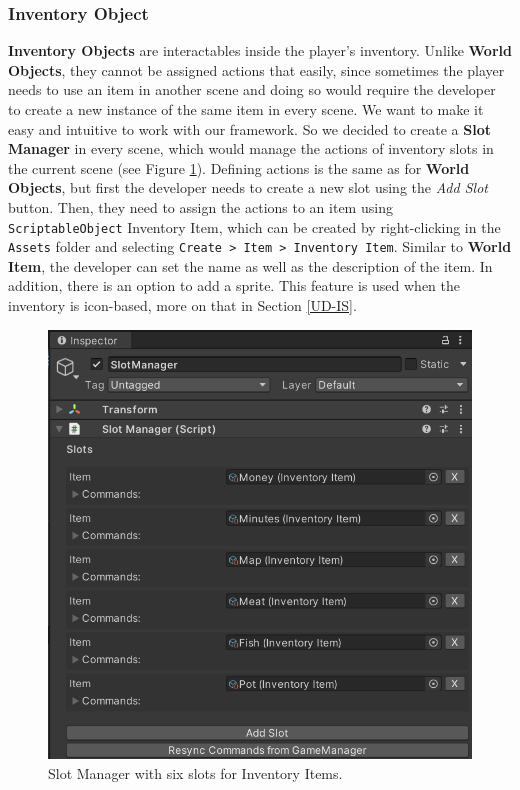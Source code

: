 \subsubsection{Inventory Object}
\label{Manual:IO}
\textbf{Inventory Objects} are interactables inside the player's inventory. Unlike \textbf{World Objects}, they cannot be assigned actions that easily, since sometimes the player needs to use an item in another scene and doing so would require the developer to create a new instance of the same item in every scene. We want to make it easy and intuitive to work with our framework. So we decided to create a \textbf{Slot Manager} in every scene, which would manage the actions of inventory slots in the current scene (see Figure \ref{fig:Manual-SM}). Defining actions is the same as for \textbf{World Objects}, but first the developer needs to create a new slot using the \textit{Add Slot} button. Then, they need to assign the actions to an item using \verb|ScriptableObject| Inventory Item, which can be created by right-clicking in the \verb|Assets| folder and selecting \verb|Create > Item > Inventory Item|. Similar to \textbf{World Item}, the developer can set the name as well as the description of the item. In addition, there is an option to add a sprite. This feature is used when the inventory is icon-based, more on that in Section \ref{UD-IS}.

\begin{figure}[H]
\centering
\includegraphics[width=.7\linewidth]{img/image_2025-07-05_133040354.png}
\caption{Slot Manager with six slots for Inventory Items.}
\label{fig:Manual-SM}
\end{figure}

